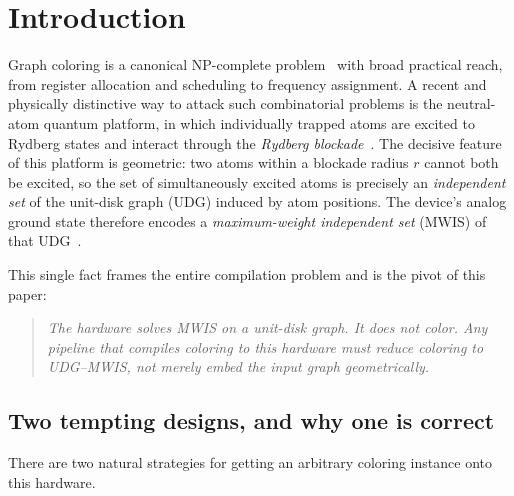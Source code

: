 \documentclass[11pt]{article}
\theoremstyle{definition}
\theoremstyle{remark}
\begin{document}
\tableofcontents
\newpage

\section{Introduction}
\label{sec:intro}

Graph coloring is a canonical NP-complete problem~\cite{Karp1972,GareyJohnson1979}
with broad practical reach, from register allocation and scheduling to frequency
assignment. A recent and physically distinctive way to attack such combinatorial
problems is the neutral-atom quantum platform, in which individually trapped atoms
are excited to Rydberg states and interact through the \emph{Rydberg
blockade}~\cite{Saffman2010,Henriet2021,Scholl2022}. The decisive feature of this
platform is geometric: two atoms within a blockade radius $r$ cannot both be excited,
so the set of simultaneously excited atoms is precisely an \emph{independent set} of
the unit-disk graph (UDG) induced by atom positions. The device's analog ground state
therefore encodes a \emph{maximum-weight independent set} (MWIS) of that
UDG~\cite{Pichler2018,Ebadi2022}.

This single fact frames the entire compilation problem and is the pivot of this
paper:

\begin{quote}
\itshape
The hardware solves MWIS on a unit-disk graph. It does not color. Any pipeline that
compiles coloring to this hardware must \emph{reduce} coloring to UDG--MWIS, not
merely \emph{embed} the input graph geometrically.
\end{quote}

\subsection{Two tempting designs, and why one is correct}

There are two natural strategies for getting an arbitrary coloring instance onto this
hardware.
\end{document}
